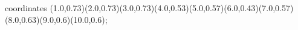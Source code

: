 					coordinates { (1.0,0.73)(2.0,0.73)(3.0,0.73)(4.0,0.53)(5.0,0.57)(6.0,0.43)(7.0,0.57)(8.0,0.63)(9.0,0.6)(10.0,0.6)};